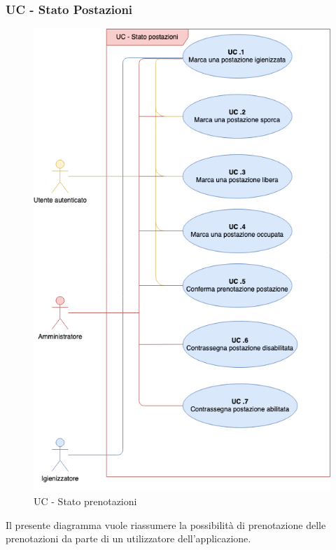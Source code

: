 \subsubsection{UC - Stato Postazioni}

\begin{figure}[h]
  \centering
    \includegraphics[scale=0.5]{src/CasiDUso/Immagini/UC11.png}
  \caption{UC  - Stato prenotazioni}
\end{figure}

Il presente diagramma vuole riassumere la possibilità di prenotazione delle prenotazioni da parte di un utilizzatore dell’applicazione.

